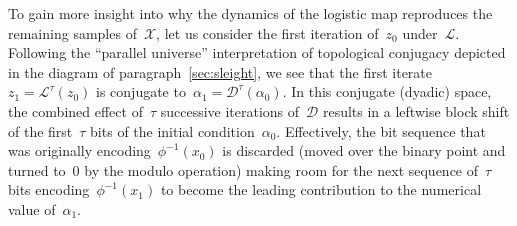 \documentclass{article}
\begin{document}
\noindent To gain more insight into why the dynamics of the logistic map reproduces the remaining samples of~$\mathcal{X}$, let us consider the first iteration of~$z_0$ under~$\mathcal{L}$.  Following the ``parallel universe'' interpretation of topological conjugacy depicted in the diagram of paragraph~\ref{sec:sleight}, we see that the first iterate~$z_1 = \mathcal{L}^\tau(z_0)$ is conjugate to~$\alpha_1 = \mathcal{D}^\tau(\alpha_0)$.  In this conjugate (dyadic) space, the combined effect of~$\tau$ successive iterations of~$\mathcal{D}$ results in a leftwise block shift of the first~$\tau$ bits of the initial condition~$\alpha_0$.  Effectively, the bit sequence that was originally encoding~$\phi^{-1}(x_0)$ is discarded (moved over the binary point and turned to~0 by the modulo operation) making room for the next sequence of~$\tau$ bits encoding~$\phi^{-1}(x_1)$ to become the leading contribution to the numerical value of~$\alpha_1$.    \\ \\
\end{document}
